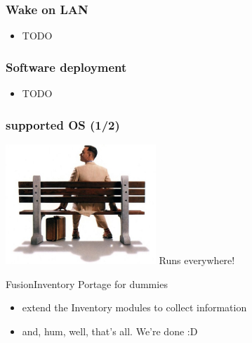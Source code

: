 \begin{frame}
    \frametitle{Wake on LAN}

    \begin{itemize}
        \item TODO
    \end{itemize}
\end{frame}

\begin{frame}
    \frametitle{Software deployment}

    \begin{itemize}
        \item TODO
    \end{itemize}
\end{frame}

\begin{frame}
    \frametitle{supported OS (1/2)}

    \includegraphics[height=4.5cm]{pics/forrest.jpg}
    Runs everywhere!

    \pause

    \begin{block}{FusionInventory Portage for dummies}
        \begin{itemize}
            \item extend the Inventory modules to collect information
            \item and, hum, well, that's all. We're done :D
        \end{itemize}
    \end{block}
\end{frame}

